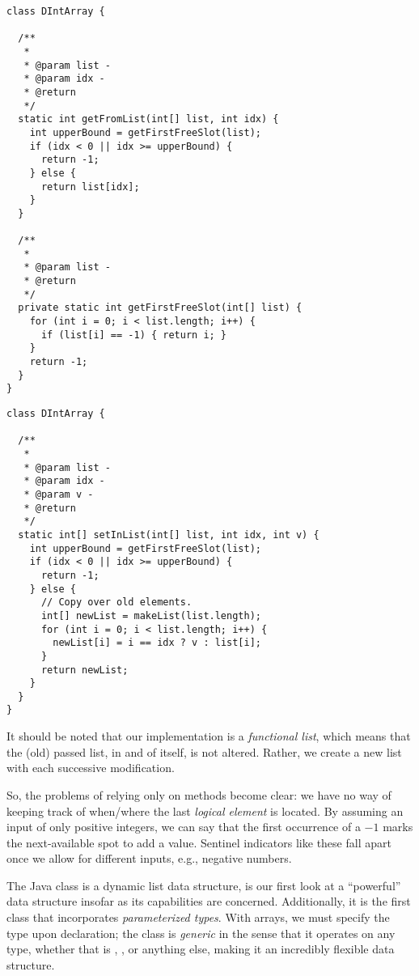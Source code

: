 \begin{lstlisting}[language=MyJava]
class DIntArray {

  /**
   *
   * @param list - 
   * @param idx - 
   * @return 
   */
  static int getFromList(int[] list, int idx) {
    int upperBound = getFirstFreeSlot(list);
    if (idx < 0 || idx >= upperBound) {
      return -1;
    } else {
      return list[idx];
    }
  }

  /**
   *
   * @param list - 
   * @return 
   */
  private static int getFirstFreeSlot(int[] list) {
    for (int i = 0; i < list.length; i++) {
      if (list[i] == -1) { return i; }
    }
    return -1;
  }
}
\end{lstlisting}

\begin{lstlisting}[language=MyJava]
class DIntArray {

  /**
   *
   * @param list - 
   * @param idx - 
   * @param v - 
   * @return 
   */
  static int[] setInList(int[] list, int idx, int v) {
    int upperBound = getFirstFreeSlot(list);
    if (idx < 0 || idx >= upperBound) {
      return -1;
    } else {
      // Copy over old elements.
      int[] newList = makeList(list.length);
      for (int i = 0; i < list.length; i++) {
        newList[i] = i == idx ? v : list[i];  
      }
      return newList;
    }
  }
}
\end{lstlisting}

It should be noted that our implementation is a \emph{functional list}, which means that the (old) passed list, in and of itself, is not altered. Rather, we create a new list with each successive modification.

So, the problems of relying only on methods become clear: we have no way of keeping track of when/where the last \emph{logical element} is located. By assuming an input of only positive integers, we can say that the first occurrence of a $-1$ marks the next-available spot to add a value. Sentinel indicators like these fall apart once we allow for different inputs, e.g., negative numbers. 

The Java  class is a dynamic list data structure, is our first look at a ``powerful'' data structure insofar as its capabilities are concerned. Additionally, it is the first class that incorporates \emph{parameterized types}. With arrays, we must specify the type upon declaration; the  class is \emph{generic} in the sense that it operates on any type, whether that is , , or anything else, making it an incredibly flexible data structure. 

